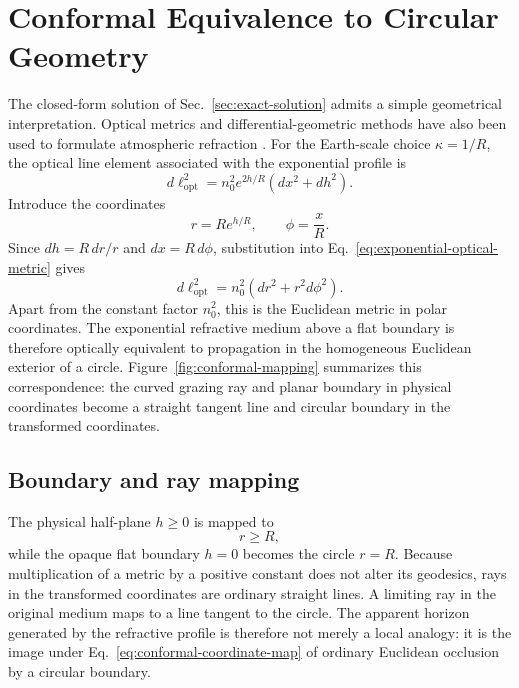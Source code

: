 \section{Conformal Equivalence to Circular Geometry}
\label{sec:conformal-equivalence}

The closed-form solution of Sec.~\ref{sec:exact-solution} admits a simple
geometrical interpretation. Optical metrics and differential-geometric
methods have also been used to formulate atmospheric refraction
\cite{kropla1992differential}. For the Earth-scale choice $\kappa=1/R$, the optical line element associated with the exponential profile is
\begin{equation}
    d\ell_{\mathrm{opt}}^2
    =
    n_0^2 e^{2h/R}
    \left(dx^2+dh^2\right).
    \label{eq:exponential-optical-metric}
\end{equation}
Introduce the coordinates
\begin{equation}
    r=R e^{h/R},
    \qquad
    \phi=\frac{x}{R}.
    \label{eq:conformal-coordinate-map}
\end{equation}
Since $dh=R\,dr/r$ and $dx=R\,d\phi$, substitution into
Eq.~\eqref{eq:exponential-optical-metric} gives
\begin{equation}
    d\ell_{\mathrm{opt}}^2
    =
    n_0^2
    \left(dr^2+r^2d\phi^2\right).
    \label{eq:euclidean-polar-optical-metric}
\end{equation}
Apart from the constant factor $n_0^2$, this is the Euclidean metric in polar
coordinates. The exponential refractive medium above a flat boundary is
therefore optically equivalent to propagation in the homogeneous Euclidean
exterior of a circle.
Figure~\ref{fig:conformal-mapping} summarizes this correspondence: the
curved grazing ray and planar boundary in physical coordinates become a
straight tangent line and circular boundary in the transformed coordinates.



\subsection{Boundary and ray mapping}

The physical half-plane $h\geq 0$ is mapped to
\begin{equation}
    r\geq R,
\end{equation}
while the opaque flat boundary $h=0$ becomes the circle $r=R$. Because
multiplication of a metric by a positive constant does not alter its
geodesics, rays in the transformed coordinates are ordinary straight lines.
A limiting ray in the original medium maps to a line tangent to the circle.
The apparent horizon generated by the refractive profile is therefore not
merely a local analogy: it is the image under Eq.~\eqref{eq:conformal-coordinate-map} of ordinary Euclidean occlusion by a circular boundary.

